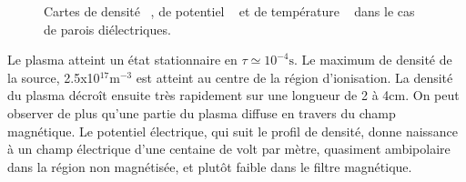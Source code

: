 \begin{refsection}
\begin{figure}[htbp]
    \centering
    \caption{Cartes de densité ~, de potentiel
    ~ et de température
    ~ dans le cas de parois
    diélectriques.}
    \label{2-CartesWithTe}
	\end{figure}

Le plasma atteint un état stationnaire en $\tau\simeq 10^{-4}\text{s}$. Le
maximum de densité de la source, 2.5x10$^{17}\text{m}^{-3}$ est atteint au
centre de la région d'ionisation. La densité du plasma décroît ensuite très
rapidement sur une longueur de 2 à 4cm. On peut observer de plus qu'une partie
du plasma diffuse en travers du champ magnétique. Le potentiel électrique, qui
suit le profil de densité, donne naissance à un champ électrique d'une centaine
de volt par mètre, quasiment ambipolaire dans la région non magnétisée, et
plutôt faible dans le filtre magnétique.


\end{refsection}

